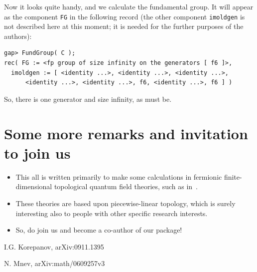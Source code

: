 \documentclass{article}
\begin{document}
Now it looks quite handy, and we calculate the fundamental group. It will appear as the component \verb|FG| in the following record (the other component \verb|imoldgen| is not described here at this moment; it is needed for the further purposes of the authors):
\begin{verbatim}
gap> FundGroup( C );
rec( FG := <fp group of size infinity on the generators [ f6 ]>, 
  imoldgen := [ <identity ...>, <identity ...>, <identity ...>, 
      <identity ...>, <identity ...>, f6, <identity ...>, f6 ] )
\end{verbatim}
So, there is one generator and size infinity, as must be.


\section{Some more remarks and invitation to join us}

\begin{itemize}
\item This all is written primarily to make some calculations in fermionic finite-dimensional topological quantum field theories, such as in~\cite{K}.
\item These theories are based upon piecewise-linear topology, which is surely interesting also to people with other specific research interests.
\item So, do join us and become a co-author of our package!
\end{itemize}


\begin{thebibliography}{99}

I.G. Korepanov, arXiv:0911.1395

N. Mnev, arXiv:math/0609257v3

\end{thebibliography}
\end{document}
